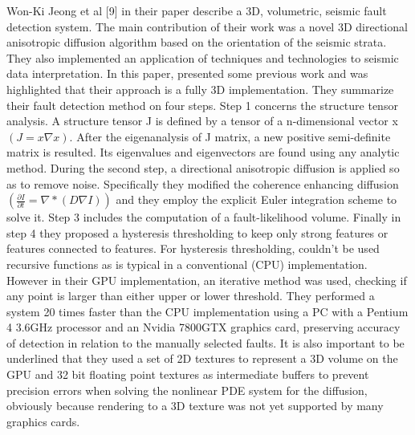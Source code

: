 Won-Ki Jeong et al [9] in their paper describe a 3D, volumetric, seismic fault detection system. The main contribution of their work was a novel 3D directional anisotropic diffusion algorithm based on the orientation of the seismic strata. They also implemented an application of techniques and technologies to seismic data interpretation. In this paper, presented some previous work and was highlighted that their approach is a fully 3D implementation. They summarize their fault detection method on four steps. Step 1 concerns the structure tensor analysis. A structure tensor J is defined by a tensor of a n-dimensional vector x $(J = x \nabla x)$. After the eigenanalysis of J matrix, a new positive semi-definite matrix is resulted. Its eigenvalues and eigenvectors are found using any analytic method. During the second step,  a directional anisotropic diffusion is applied so as to remove noise. Specifically they modified the coherence enhancing diffusion $( \frac{\partial I}{\partial t} = \nabla * (D \nabla I))$ and they employ the explicit Euler integration scheme to solve it. Step 3 includes the computation of a fault-likelihood volume. Finally in step 4 they proposed a hysteresis thresholding to keep only strong features or features connected to features. For hysteresis thresholding, couldn't be used recursive functions as is typical in a conventional (CPU) implementation. However in their GPU implementation, an iterative method was used, checking if any point is larger than either upper or lower threshold. They performed a system 20 times faster than the CPU implementation using a PC with a Pentium 4 3.6GHz processor and an Nvidia 7800GTX graphics card, preserving accuracy of detection in relation to the manually selected faults. It is also important to be underlined that they used a set of 2D textures to represent a 3D volume on the GPU and 32 bit floating point textures as intermediate buffers to prevent precision errors when solving the nonlinear PDE system for the diffusion, obviously because rendering to a 3D texture was not yet supported by many graphics cards.

